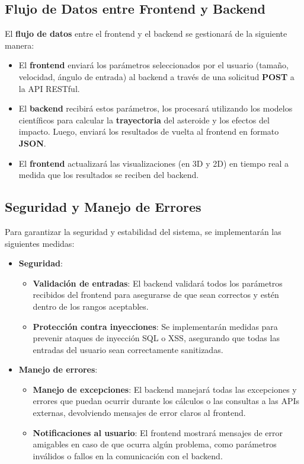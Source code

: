 \documentclass[conference]{IEEEtran}
\begin{document}
\subsection{Flujo de Datos entre Frontend y Backend}
El \textbf{flujo de datos} entre el frontend y el backend se gestionará de la siguiente manera:
\begin{itemize}
	\item El \textbf{frontend} enviará los parámetros seleccionados por el usuario
	      (tamaño, velocidad, ángulo de entrada) al backend a través de una solicitud
	      \textbf{POST} a la API RESTful.
	\item El \textbf{backend} recibirá estos parámetros, los procesará utilizando los
	      modelos científicos para calcular la \textbf{trayectoria} del asteroide y los
	      efectos del impacto. Luego, enviará los resultados de vuelta al
	      frontend en formato \textbf{JSON}.
	\item El \textbf{frontend} actualizará las visualizaciones (en 3D y 2D)
	      en tiempo real a medida que los resultados se reciben del backend.
\end{itemize}

\subsection{Seguridad y Manejo de Errores}
Para garantizar la seguridad y estabilidad del sistema, se implementarán las siguientes medidas:
\begin{itemize}
	\item \textbf{Seguridad}:
	      \begin{itemize}
		      \item \textbf{Validación de entradas}: El backend validará todos los parámetros
		            recibidos del frontend para asegurarse de que sean correctos y estén dentro de
		            los rangos aceptables.
		      \item \textbf{Protección contra inyecciones}: Se implementarán medidas para prevenir ataques de inyección
		            SQL o XSS, asegurando que todas las entradas del usuario sean
		            correctamente sanitizadas.
	      \end{itemize}
	\item \textbf{Manejo de errores}:
	      \begin{itemize}
		      \item \textbf{Manejo de excepciones}: El backend manejará todas las
		            excepciones y errores que puedan ocurrir durante los cálculos o
		            las consultas a las APIs externas, devolviendo mensajes de error
		            claros al frontend.
		      \item \textbf{Notificaciones al usuario}: El frontend mostrará mensajes
		            de error amigables en caso de que ocurra algún problema, como
		            parámetros inválidos o fallos en la comunicación con el backend.
	      \end{itemize}
\end{itemize}
\end{document}
